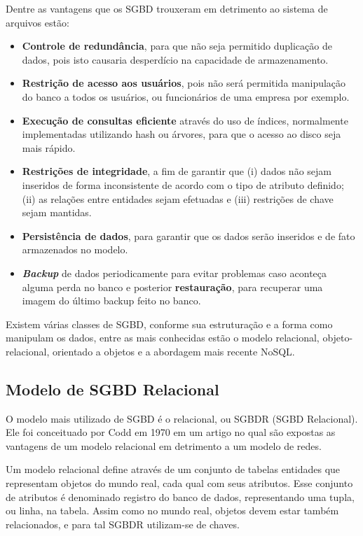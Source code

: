 Dentre as vantagens que os SGBD trouxeram em detrimento ao sistema de arquivos estão:

\begin{itemize}
    \item{\textbf{Controle de redundância}}, para que não seja permitido duplicação de dados, pois isto causaria desperdício na capacidade de armazenamento.
    \item{\textbf{Restrição de acesso aos usuários}}, pois não será permitida manipulação do banco a todos os usuários, ou funcionários de uma empresa por exemplo.
    \item{\textbf{Execução de consultas eficiente}} através do uso de índices, normalmente implementadas utilizando hash ou árvores, para que o acesso ao disco seja mais rápido.
    \item{\textbf{Restrições de integridade}}, a fim de garantir que (i) dados não sejam inseridos de forma inconsistente de acordo com o tipo de atributo definido; 
    (ii) as relações entre entidades sejam efetuadas e (iii) restrições de chave sejam mantidas.
    \item{\textbf{Persistência de dados}}, para garantir que os dados serão inseridos e de fato armazenados no modelo.
    \item{\textbf{\textit{Backup}}} de dados periodicamente para evitar problemas caso aconteça alguma perda no banco e posterior \textbf{restauração}, para recuperar uma imagem do último backup feito no banco.
\end{itemize}

Existem várias classes de SGBD, conforme sua estruturação e a forma como manipulam os dados, 
entre as mais conhecidas estão o modelo relacional, objeto-relacional, orientado a 
objetos e a abordagem mais recente NoSQL.

\subsection{Modelo de SGBD Relacional}

O modelo mais utilizado de SGBD é o relacional, ou SGBDR (SGBD Relacional). Ele foi conceituado por 
Codd \cite{codd1970relational} em 1970 em um artigo no qual são expostas as 
vantagens de um modelo relacional em detrimento a um modelo de redes. 

Um modelo relacional define através de um conjunto de tabelas entidades que representam 
objetos do mundo real, cada qual com seus atributos. Esse conjunto de atributos é 
denominado registro do banco de dados, representando uma tupla, ou linha, na tabela. Assim como no mundo real, 
objetos devem estar também relacionados, e para tal SGBDR utilizam-se de chaves.

